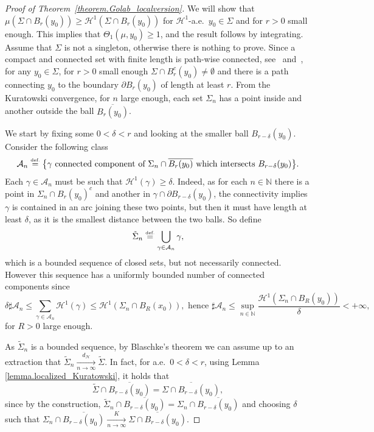 \documentclass[10pt]{amsart}
\theoremstyle{definition}
\newcommand{\eqdef}{\ensuremath{\stackrel{\mbox{\upshape\tiny def.}}{=}}}
\newcommand\cH{\mathcal{H}}
\newcommand{\distH}{d_{\mathcal{H}}}
\begin{document}
\begin{proof}[Proof of Theorem~\ref{theorem.Golab_localversion}]
We will show that $\mu(\Sigma \cap B_r(y_0)) \ge \cH^1(\Sigma \cap B_r(y_0))$ for $\cH^1$\nobreakdash-a.e.\ $y_0\in \Sigma$ and for $r>0$ small enough. This implies that $\Theta_1(\mu, y_0) \ge 1$, and the result follows by integrating. Assume that $\Sigma$ is not a singleton, otherwise there is nothing to prove. Since a compact and connected set with finite length is path-wise connected, see~\cite[Prop.\,30.1 \& Cor.\,30.2]{david2006singular} and~\cite[Th.\,4.4]{alberti2017structure}, for any $y_0 \in \Sigma$, for $r>0$ small enough $\Sigma \cap B_r^c(y_0) \neq \emptyset$ and there is a path connecting $y_0$ to the boundary $\partial B_r(y_0)$ of length at least $r$. From the Kuratowski convergence, for $n$ large enough, each set $\Sigma_n$ has a point inside and another outside the ball $\overline{B_r(y_0)}$.

We start by fixing some $0< \delta < r$ and looking at the smaller ball $B_{r-\delta}(y_0)$. Consider the following class
\[
\mathcal{A}_n
\eqdef
\bigl\{
\gamma \text{ connected component of $\Sigma_n\cap \overline{B_r(y_0)}$ which intersects $B_{r-\delta}(y_0)$}
\bigr\}.
\]
Each $\gamma \in \mathcal{A}_n$ must be such that $\cH^1(\gamma) \ge \delta$. Indeed, as for each $n \in \mathbb{N}$ there is a point in $\Sigma_n\cap B_r(y_0)^c$ and another in $\gamma \cap \partial B_{r-\delta}(y_0)$, the connectivity implies $\gamma$ is contained in an arc joining these two points, but then it must have length at least $\delta$, as it is the smallest distance between the two balls. So define
\[
\tilde\Sigma_n \eqdef
\bigcup_{\gamma \in \mathcal{A}_n}
\gamma,
\]
which is a bounded sequence of closed sets, but not necessarily connected. However this sequence has a uniformly bounded number of connected components since
\[
\delta\sharp \mathcal{A}_n
\le
\sum_{\gamma \in \mathcal{A}_n} \cH^1(\gamma)
\le \cH^1(\Sigma_n \cap B_R(x_0)), \text{ hence }
\sharp \mathcal{A}_n
\le \sup_{n \in \mathbb{N}} \frac{\cH^1(\Sigma_n\cap B_R(y_0))}{\delta}
< +\infty,
\]
for $R>0$ large enough.

As $\tilde \Sigma_n$ is a bounded sequence, by Blaschke's theorem we can assume up to an extraction that $\tilde \Sigma_n \xrightarrow[n \to \infty]{\distH} \tilde \Sigma$. In fact, for a.e.\ $0 < \delta < r$, using Lemma \ref{lemma.localized_Kuratowski}, it holds that
\begin{equation}\label{identity}
\tilde \Sigma\cap \overline{B_{r-\delta}(y_0)} = \overline{\Sigma\cap B_{r-\delta}(y_0)},
\end{equation}
since by the construction, $\tilde \Sigma_n\cap \overline{B_{r-\delta}(y_0)} = \Sigma_n\cap \overline{B_{r-\delta}(y_0)}$ and choosing $\delta$ such that $\Sigma_n\cap \overline{B_{r-\delta}(y_0)} \xrightarrow[n \to \infty]{K} \overline{\Sigma\cap B_{r-\delta}(y_0)}$.


\end{proof}
\end{document}
